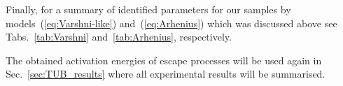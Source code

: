 %



%



Finally, for a summary of identified parameters for our samples by models~(\ref{eq:Varshni-like}) and~(\ref{eq:Arhenius}) which was discussed above see Tabs.~\ref{tab:Varshni} and~\ref{tab:Arhenius}, respectively. 

The obtained activation energies of escape processes will be used again in Sec.~\ref{sec:TUB_results} where all experimental results will be summarised.





